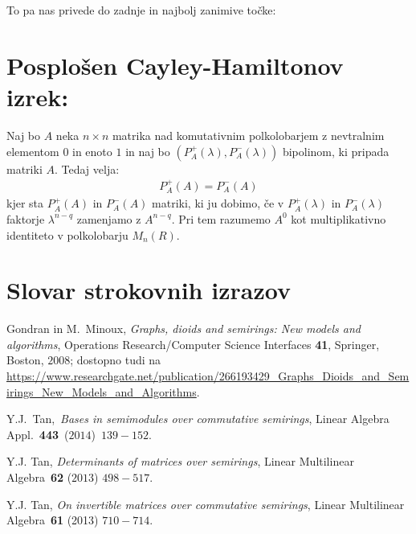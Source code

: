 \documentclass[mat1]{fmfdelo}
\begin{document}
To pa nas privede do zadnje in najbolj zanimive točke:

\section{Posplošen Cayley-Hamiltonov izrek:}

\begin{izrek}
	Naj bo $A$ neka $n\times n$ matrika nad komutativnim polkolobarjem z nevtralnim elementom $0$ in enoto $1$ in naj bo $(P^{+}_A(\lambda), P^{-}_A(\lambda))$ bipolinom, ki pripada matriki $A$. Tedaj velja: \begin{align}
		P^{+}_A(A) = P^{-}_A(A)
	\end{align}
	kjer sta $P^{+}_A(A)$ in $P^{-}_A(A)$ matriki, ki ju dobimo, če v $P^{+}_A(\lambda)$ in $P^{-}_A(\lambda)$ faktorje $\lambda^{n-q}$ zamenjamo z $A^{n-q}$. Pri tem razumemo $A^0$ kot multiplikativno identiteto v polkolobarju $M_n(R)$.
\end{izrek}

\section*{Slovar strokovnih izrazov}

\begin{thebibliography}{99}
	
	
	 Gondran in M.~Minoux, \emph{Graphs, dioids and semirings: New models and algorithms}, Operations Research/Computer Science Interfaces \textbf{41}, Springer, Boston, $2008$; dostopno tudi na \url{https://www.researchgate.net/publication/266193429_Graphs_Dioids_and_Semirings_New_Models_and_Algorithms}.
	
	 Y.J.~Tan,~\emph{Bases in semimodules over commutative semirings}, Linear Algebra Appl.~\textbf{443}~($2014$)~$139-152$.
	
	 Y.J. Tan, \emph{Determinants of matrices over semirings}, Linear Multilinear Algebra~\textbf{62} ($2013$) $498-517$.
	
	 Y.J. Tan, \emph{On invertible matrices over commutative semirings}, Linear Multilinear Algebra~\textbf{61} (2013) $710-714$.
	
	
\end{thebibliography}
\end{document}
